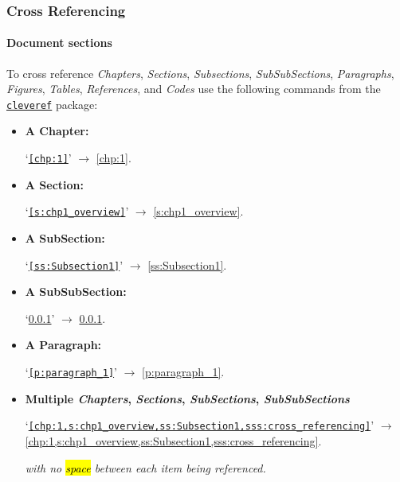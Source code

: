 \documentclass[../Dissertation]{subfiles}
\begin{document}
\subsubsection{Cross Referencing}\label{sss:cross_referencing}
\paragraph{Document sections}
    To cross reference \emph{Chapters}, \emph{Sections}, \emph{Subsections},
    \emph{SubSubSections}, \emph{Paragraphs}, \emph{Figures}, \emph{Tables},
    \emph{References}, and \emph{Codes} use the following  commands from the
    \href{https://ctan.org/pkg/cleveref?lang=en}{\texttt{cleveref}} package:
    
    {\singlespacing
    \begin{itemize}
        \setlength\itemsep{0em}
        \item \textbf{A Chapter:}
            \begin{center}`\texttt{\cref{chp:1}}'
        $\longrightarrow$ \cref{chp:1}. \end{center}
        \item \textbf{A Section:}
            \begin{center}`\texttt{\cref{s:chp1_overview}}'
            $\longrightarrow$ \cref{s:chp1_overview}.\end{center}
        \item \textbf{A SubSection:}
            \begin{center}`\texttt{\cref{ss:Subsection1}}'
            $\longrightarrow$ \cref{ss:Subsection1}.\end{center}
        \item \textbf{A SubSubSection:}
            \begin{center}`\texttt{\cref{sss:cross_referencing}}'
            $\longrightarrow$ \cref{sss:cross_referencing}.\end{center}
        \item \textbf{A Paragraph:}
            \begin{center}`\texttt{\cref{p:paragraph_1}}'
            $\longrightarrow$ \cref{p:paragraph_1}.\end{center}
        \item \textbf{Multiple \emph{Chapters}, \emph{Sections}, \emph{SubSections},
            \emph{SubSubSections}} \\
            \begin{center}`\texttt{\cref{chp:1,s:chp1_overview,ss:Subsection1,sss:cross_referencing}}'
            $\longrightarrow$
            \cref{chp:1,s:chp1_overview,ss:Subsection1,sss:cross_referencing}.\end{center}
            \emph{with no \hl{space} between each item being referenced.}
    \end{itemize}}
    
\end{document}
